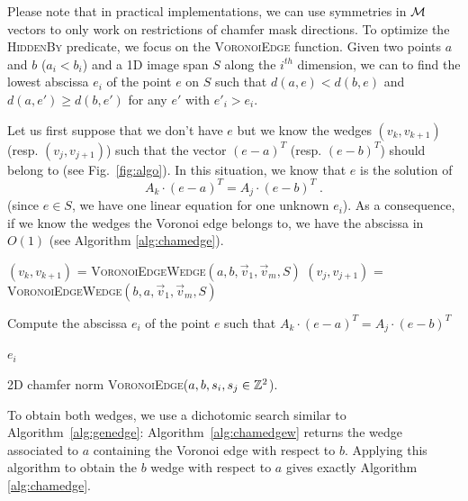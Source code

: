 \documentclass{llncs}
\begin{document}
Please note that in practical implementations, we can use symmetries
in $\mathcal{M}$ vectors to only work on restrictions of chamfer mask
directions.  To optimize the \textsc{HiddenBy} predicate, we focus on
the \textsc{VoronoiEdge} function. Given two points $a$ and $b$
($a_i<b_i$) and a 1D image span $S$ along the $i^{th}$ dimension, we
can to find the lowest abscissa $e_i$ of the point $e$ on $S$ such
that $d(a,e) < d(b,e)$ and $d(a,e')\geq d(b, e')$ for any $e'$ with
$e'_i>e_i$.

Let us first suppose that we don't have $e$ but we know the wedges
$(v_{k},v_{k+1})$ (resp. $(v_j,v_{j+1})$) such that the vector
$(e-a)^T$ (resp. $(e-b)^T$) should belong to (see Fig.~\ref{fig:algo}). In this
situation, we know that $e$ is the solution of
\begin{equation}
\label{eq:3}
  A_k\cdot  (e-a)^T = A_j\cdot (e -b)^T\;.
\end{equation}
(since $e\in S$, we have one linear equation for one unknown
$e_i$). As a consequence, if we know the wedges the Voronoi edge
belongs to, we have the abscissa in $O(1)$ (see Algorithm \ref{alg:chamedge}).
\begin{algorithm}[h]\footnotesize
  $(v_k,v_{k+1})$ = \textsc{VoronoiEdgeWedge}$(a,b,\vec{v}_1,\vec{v}_m, S)$\;
  $(v_j,v_{j+1})$ = \textsc{VoronoiEdgeWedge}$(b,a,\vec{v}_1,\vec{v}_m, S)$\;

  Compute the abscissa $e_i$ of the point $e$ such that $A_k\cdot
  (e-a)^T = A_j\cdot (e -b)^T$\;

  \Return $e_i$\;
  \caption{2D chamfer norm \textsc{VoronoiEdge}($a,b,s_i,s_j\in{\mathbb{Z}}^2$).\label{alg:chamedge}}
\end{algorithm}
To obtain both wedges, we use a dichotomic search similar to
Algorithm~\ref{alg:genedge}: Algorithm~\ref{alg:chamedgew} returns the
wedge associated to $a$ containing the Voronoi edge with respect to
$b$. Applying this algorithm to obtain the $b$ wedge with respect to
$a$ gives exactly  Algorithm \ref{alg:chamedge}.
\end{document}
